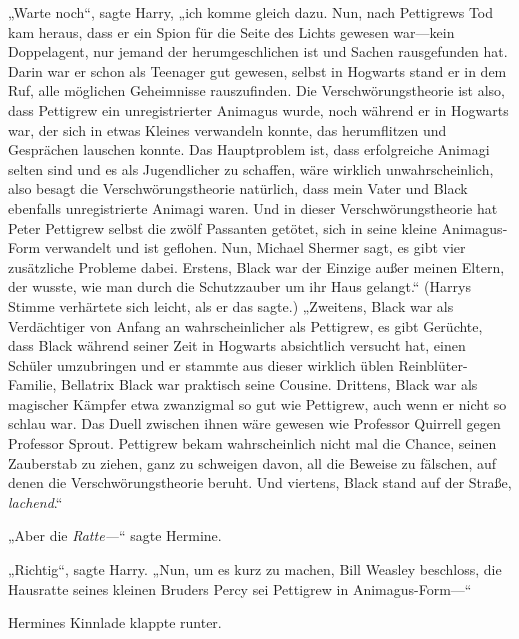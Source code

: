 „Warte noch“, sagte Harry, „ich komme gleich dazu. Nun, nach Pettigrews Tod kam heraus, dass er ein Spion für die Seite des Lichts gewesen war—kein Doppelagent, nur jemand der herumgeschlichen ist und Sachen rausgefunden hat. Darin war er schon als Teenager gut gewesen, selbst in Hogwarts stand er in dem Ruf, alle möglichen Geheimnisse rauszufinden. Die Verschwörungstheorie ist also, dass Pettigrew ein unregistrierter Animagus wurde, noch während er in Hogwarts war, der sich in etwas Kleines verwandeln konnte, das herumflitzen und Gesprächen lauschen konnte. Das Hauptproblem ist, dass erfolgreiche Animagi selten sind und es als Jugendlicher zu schaffen, wäre wirklich unwahrscheinlich, also besagt die Verschwörungstheorie natürlich, dass mein Vater und Black ebenfalls unregistrierte Animagi waren. Und in dieser Verschwörungstheorie hat Peter Pettigrew selbst die zwölf Passanten getötet, sich in seine kleine Animagus-Form verwandelt und ist geflohen. Nun, Michael Shermer sagt, es gibt vier zusätzliche Probleme dabei. Erstens, Black war der Einzige außer meinen Eltern, der wusste, wie man durch die Schutzzauber um ihr Haus gelangt.“ (Harrys Stimme verhärtete sich leicht, als er das sagte.) „Zweitens, Black war als Verdächtiger von Anfang an wahrscheinlicher als Pettigrew, es gibt Gerüchte, dass Black während seiner Zeit in Hogwarts absichtlich versucht hat, einen Schüler umzubringen und er stammte aus dieser wirklich üblen Reinblüter-Familie, Bellatrix Black war praktisch seine Cousine. Drittens, Black war als magischer Kämpfer etwa zwanzigmal so gut wie Pettigrew, auch wenn er nicht so schlau war. Das Duell zwischen ihnen wäre gewesen wie Professor Quirrell gegen Professor Sprout. Pettigrew bekam wahrscheinlich nicht mal die Chance, seinen Zauberstab zu ziehen, ganz zu schweigen davon, all die Beweise zu fälschen, auf denen die Verschwörungstheorie beruht. Und viertens, Black stand auf der Straße, \emph{lachend}.“

„Aber die \emph{Ratte—}“ sagte Hermine.

„Richtig“, sagte Harry. „Nun, um es kurz zu machen, Bill Weasley beschloss, die Hausratte seines kleinen Bruders Percy sei Pettigrew in Animagus-Form—“

Hermines Kinnlade klappte runter.

